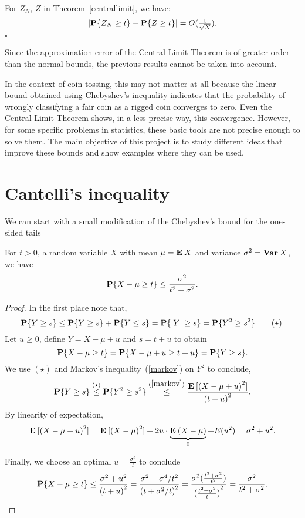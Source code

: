 \begin{theorem}\label{berryessen}
  For $Z_N$, $Z$ in Theorem~\ref{centrallimit}, we have:
  \[ \left|\P\{Z_N \geq t\} - \P\{Z \geq t\}\right| = O(\tfrac{1}{\sqrt{N}}). \]
  \hfill $\square$
\end{theorem}

Since the approximation error of the Central Limit Theorem is of greater order than the normal bounds, the previous results cannot be taken into account.

\vspace*{1em}

In the context of coin tossing, this may not matter at all because the linear bound obtained using Chebyshev's inequality indicates that the probability of wrongly classifying a fair coin as a rigged coin converges to zero. Even the Central Limit Theorem shows, in a less precise way, this convergence. However, for some specific problems in statistics, these basic tools are not precise enough to solve them. The main objective of this project is to study different ideas that improve these bounds and show examples where they can be used.

\section{Cantelli's inequality}
We can start with a small modification of the Chebyshev's bound for the one-sided tails

\begin{theorem}\label{cantelli}
  For $t > 0$, a random variable $X$ with mean $\mu = \E X$ and variance $\sigma^2 = \Var X$, we have
  \[ \P\{X-\mu \geq t\} \leq \frac{\sigma^2}{t^2 + \sigma^2}. \] 
\end{theorem}

\begin{proof}
  In the first place note that,
  \[ \P\{ Y \geq s\} \leq \P\{ Y \geq s\} + \P\{ Y \leq s\} = \P\{|Y| \geq s\} = \P\{ Y^2 \geq s^2\} \tag*{($\star$)}. \] 
  Let $u \geq 0$, define $Y = X-\mu + u$ and $s = t+u$ to obtain
  \[ \P\{X-\mu \geq t\} = \P\{X-\mu + u \geq t + u\} = \P\{Y \geq s\}. \]
  We use $(\star)$ and Markov's inequality~(\ref{markov}) on $Y^2$ to conclude,
  \[ \P\{Y \geq s\} \overset{(\star)}{\leq} \P\{ Y^2 \geq s^2\} \overset{(\ref{markov})}{\leq} \frac{\E[{(X-\mu+u)}^2]}{{(t+u)}^2}.\]
  By linearity of expectation,
  \[ \E[{(X-\mu+u)}^2] = \E[{(X-\mu)}^2] + 2u \cdot \underbrace{\E(X-\mu)}_{0} + E(u^2) = \sigma^2 + u^2. \]

  Finally, we choose an optimal $u = \frac{\sigma^2}{t}$ to conclude
  \[
    \P\{X-\mu \geq t\} \leq \frac{\sigma^2 + u^2}{{(t+u)}^2}
     = \frac{\sigma^2 + \sigma^4/t^2}{{{(t+\sigma^2/t)}^2}}
     = \frac{\sigma^2 (\tfrac{t^2+\sigma^2}{t^2})}{{(\tfrac{t^2+\sigma^2}{t})}^2}
     = \frac{\sigma^2}{t^2+\sigma^2}.\]
\end{proof}

